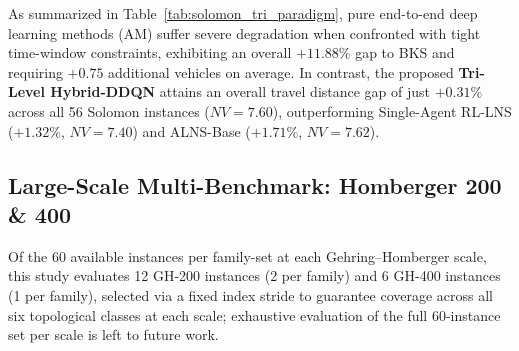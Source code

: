 As summarized in Table~\ref{tab:solomon_tri_paradigm}, pure end-to-end deep learning methods (AM) suffer severe degradation when confronted with tight time-window constraints, exhibiting an overall $+11.88\%$ gap to BKS and requiring $+0.75$ additional vehicles on average. In contrast, the proposed \textbf{Tri-Level Hybrid-DDQN} attains an overall travel distance gap of just $+0.31\%$ across all 56 Solomon instances ($NV=7.60$), outperforming Single-Agent RL-LNS ($+1.32\%$, $NV=7.40$) and ALNS-Base ($+1.71\%$, $NV=7.62$).

\subsection{Large-Scale Multi-Benchmark: Homberger 200 \& 400}
\label{sec:homberger_results}

Of the 60 available instances per family-set at each Gehring--Homberger scale, this study evaluates 12 GH-200 instances (2 per family) and 6 GH-400 instances (1 per family), selected via a fixed index stride to guarantee coverage across all six topological classes at each scale; exhaustive evaluation of the full 60-instance set per scale is left to future work.

